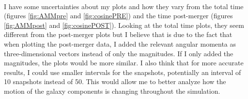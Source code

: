 \documentclass[fleqn,usenatbib]{mnras}
\begin{document}
\paragraph{} I have some uncertainties about my plots and how they vary from the total time (figures \ref{fig:AMMpre} and \ref{fig:cosinePRE}) and the time post-merger (figures \ref{fig:AMMpost} and \ref{fig:cosinePOST}). Looking at the total time plots, they seem different from the post-merger plots but I believe that is due to the fact that when plotting the post-merger data, I added the relevant angular momenta as three-dimensional vectors instead of only the magnitudes. If I only added the magnitudes, the plots would be more similar. I also think that for more accurate results, I could use smaller intervals for the snapshots, potentially an interval of 10 snapshots instead of 50. This would allow me to better analyze how the motion of the galaxy components is changing throughout the simulation.





 





\bsp	%
\label{lastpage}
\end{document}
